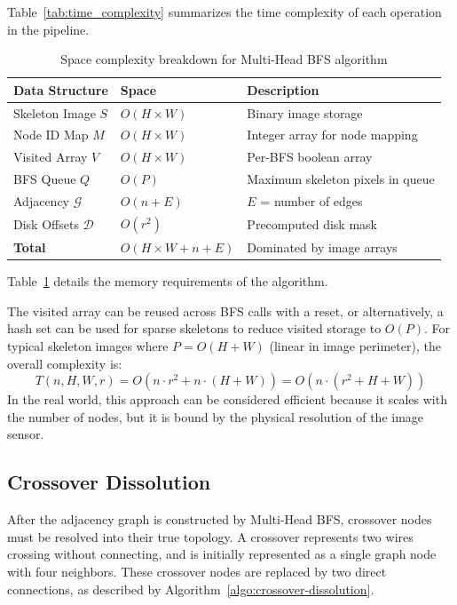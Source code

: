 Table~\ref{tab:time_complexity} summarizes the time complexity of each operation in the pipeline.

\begin{table}[H]
\centering
\caption{Space complexity breakdown for Multi-Head BFS algorithm}
\label{tab:space_complexity}
\begin{tabular}{@{}lll@{}}
\toprule
\textbf{Data Structure} & \textbf{Space} & \textbf{Description} \\
\midrule
Skeleton Image $S$ & $O(H \times W)$ & Binary image storage \\
Node ID Map $M$ & $O(H \times W)$ & Integer array for node mapping \\
Visited Array $V$ & $O(H \times W)$ & Per-BFS boolean array \\
BFS Queue $Q$ & $O(P)$ & Maximum skeleton pixels in queue \\
Adjacency $\mathcal{G}$ & $O(n + E)$ & $E$ = number of edges \\
Disk Offsets $\mathcal{D}$ & $O(r^2)$ & Precomputed disk mask \\
\midrule
\textbf{Total} & $O(H \times W + n + E)$ & Dominated by image arrays \\
\bottomrule
\end{tabular}
\end{table}

Table~\ref{tab:space_complexity} details the memory requirements of the algorithm.


The visited array can be reused across BFS calls with a reset, or alternatively, a hash set can be used for sparse skeletons to reduce visited storage to $O(P)$.
For typical skeleton images where $P = O(H + W)$ (linear in image perimeter), the overall complexity is:
\[
T(n, H, W, r) = O(n \cdot r^2 + n \cdot (H + W)) = O(n \cdot (r^2 + H + W))
\]
In the real world, this approach can be considered efficient because it scales with the number of nodes, but it is bound by the physical resolution of the image sensor.

\subsection{Crossover Dissolution}

After the adjacency graph is constructed by Multi-Head BFS, crossover nodes must be resolved into their true topology. A crossover represents two wires crossing without connecting, and is initially represented as a single graph node with four neighbors. These crossover nodes are replaced by two direct connections, as described by Algorithm~\ref{algo:crossover-dissolution}.

